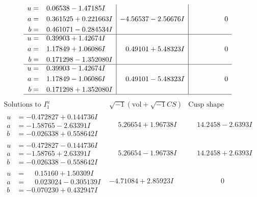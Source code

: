 \documentclass[1p]{elsarticle_modified}
\theoremstyle{definition}
\newcommand{\I}{\sqrt{-1}}
\begin{document}
$$\begin{array}{c|c|c}
\begin{aligned}
u &= \phantom{-}0.06538 - 1.47185 I \\
a &= \phantom{-}0.361525 + 0.221663 I \\
b &= \phantom{-}0.461071 - 0.284534 I\end{aligned}
 & -4.56537 - 2.56676 I & \phantom{-0.000000 } 0 \\ \hline\begin{aligned}
u &= \phantom{-}0.39903 + 1.42674 I \\
a &= \phantom{-}1.17849 + 1.06086 I \\
b &= \phantom{-}0.171298 - 1.352080 I\end{aligned}
 & \phantom{-}0.49101 + 5.48323 I & \phantom{-0.000000 } 0 \\ \hline\begin{aligned}
u &= \phantom{-}0.39903 - 1.42674 I \\
a &= \phantom{-}1.17849 - 1.06086 I \\
b &= \phantom{-}0.171298 + 1.352080 I\end{aligned}
 & \phantom{-}0.49101 - 5.48323 I & \phantom{-0.000000 } 0\\
 \hline 
 \end{array}$$\newpage$$\begin{array}{c|c|c}  
\text{Solutions to }I^u_{1}& \I (\text{vol} + \sqrt{-1}CS) & \text{Cusp shape}\\
 \hline 
\begin{aligned}
u &= -0.472827 + 0.144736 I \\
a &= -1.58765 - 2.63391 I \\
b &= -0.026338 + 0.558642 I\end{aligned}
 & \phantom{-}5.26654 + 1.96738 I & \phantom{-}14.2458 - 2.6393 I \\ \hline\begin{aligned}
u &= -0.472827 - 0.144736 I \\
a &= -1.58765 + 2.63391 I \\
b &= -0.026338 - 0.558642 I\end{aligned}
 & \phantom{-}5.26654 - 1.96738 I & \phantom{-}14.2458 + 2.6393 I \\ \hline\begin{aligned}
u &= \phantom{-}0.15160 + 1.50309 I \\
a &= \phantom{-}0.023024 - 0.305139 I \\
b &= -0.070230 + 0.432947 I\end{aligned}
 & -4.71084 + 2.85923 I & \phantom{-0.000000 } 0 \\ \hline\begin{aligned}

\end{aligned}
\end{array}$$
\end{document}
